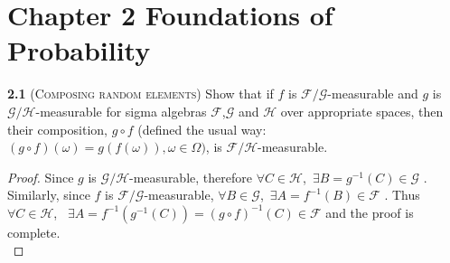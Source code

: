 

\chapter*{Chapter 2 Foundations of Probability}
\label{sec:second}



\noindent\textbf{2.1} (\textsc{Composing random elements}) Show that if $f$ is $\mathcal{F}/\mathcal{G}$-measurable and $g$
is $\mathcal{G}/\mathcal{H}$-measurable for sigma algebras $\mathcal{F}$,$\mathcal{G}$ and $\mathcal{H}$ over appropriate spaces, then
their composition, $g \circ f$ (defined the usual way: $( g \circ f )(\omega) = g(f(\omega)), \omega \in \Omega)$, is
$\mathcal{F}/\mathcal{H}$-measurable.

\begin{proof}
    Since $g$ is $\mathcal{G}/\mathcal{H}$-measurable, therefore $\forall C \in \mathcal{H}$,\ $ \exists  B=g^{-1}(C)\in \mathcal{G} $ . Similarly, since $f$ is $\mathcal{F}/\mathcal{G}$-measurable, $\forall B \in \mathcal{G}$,\ $ \exists  A=f^{-1}(B)\in \mathcal{F} $ . Thus $\forall C \in \mathcal{H}$, \ $ \exists  A=f^{-1}(g^{-1}(C))=(g\circ f)^{-1}(C)\in \mathcal{F} $ and the proof is complete. \\

\end{proof}

